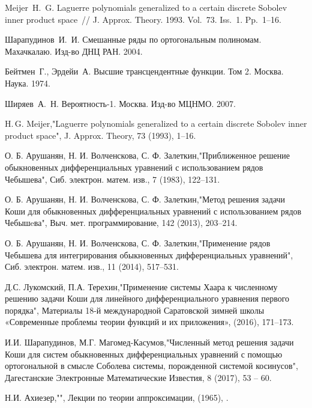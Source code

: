 \begin{thebibliography}{20}
Meijer~H.~G. Laguerre polynomials generalized to a certain discrete Sobolev inner product space~// J. Approx. Theory. 1993. Vol.~73. Iss.~1. Pp.~1--16.


Шарапудинов~И.~И. Смешанные ряды по ортогональным полиномам. Махачкалаю. Изд-во ДНЦ РАН. 2004.


Бейтмен~Г., Эрдейи~А. Высшие трансцендентные функции. Том 2. Москва. Наука. 1974.


Ширяев~А.~Н. Вероятность-1. Москва. Изд-во МЦНМО. 2007.


H.\,G. Meijer,"Laguerre polynomials generalized to a certain discrete Sobolev inner product space", J. Approx. Theory, 73 (1993), 1--16.


О. Б. Арушанян, Н. И. Волченскова, С. Ф. Залеткин,"Приближенное решение обыкновенных дифференциальных уравнений с использованием рядов Чебышева", Сиб. электрон. матем. изв., 7 (1983), 122–131.


О. Б. Арушанян, Н. И. Волченскова, С. Ф. Залеткин,"Метод решения задачи Коши для обыкновенных дифференциальных уравнений с использованием рядов Чебышeва", Выч. мет. программирование, 142 (2013), 203--214.


О. Б. Арушанян, Н. И. Волченскова, С. Ф. Залеткин,"Применение рядов Чебышева для интегрирования обыкновенных дифференциальных уравнений", Сиб. электрон. матем. изв., 11 (2014), 517--531.


Д.С. Лукомский, П.А. Терехин,"Применение системы Хаара к численному решению задачи Коши для линейного дифференциального уравнения первого порядка", Материалы 18-й международной Саратовской зимней школы «Современные проблемы теории функций и их приложения»,  (2016), 171--173.


И.И. Шарапудинов, М.Г. Магомед-Касумов,"Численный метод решения задачи Коши для систем обыкновенных дифференциальных уравнений с помощью ортогональной в смысле Соболева системы, порожденной системой косинусов", Дагестанские Электронные Математические Известия, 8 (2017), 53 -- 60.


Н.И. Ахиезер,"", Лекции по теории аппроксимации,  (1965), .


\end{thebibliography}
